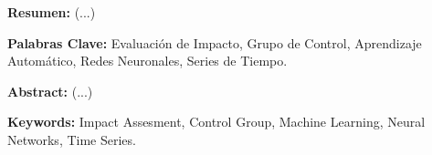 \documentclass[../main.tex]{subfiles}
\begin{document}
\noindent \textbf{Resumen: } (...)

\medskip

\noindent \textbf{Palabras Clave: } Evaluación de Impacto, Grupo de Control, Aprendizaje Automático,
Redes Neuronales, Series de Tiempo.

\bigskip

\noindent \textbf{Abstract: } (...)

\medskip

\noindent \textbf{Keywords: } Impact Assesment, Control Group, Machine Learning, Neural Networks,
Time Series.
\end{document}
